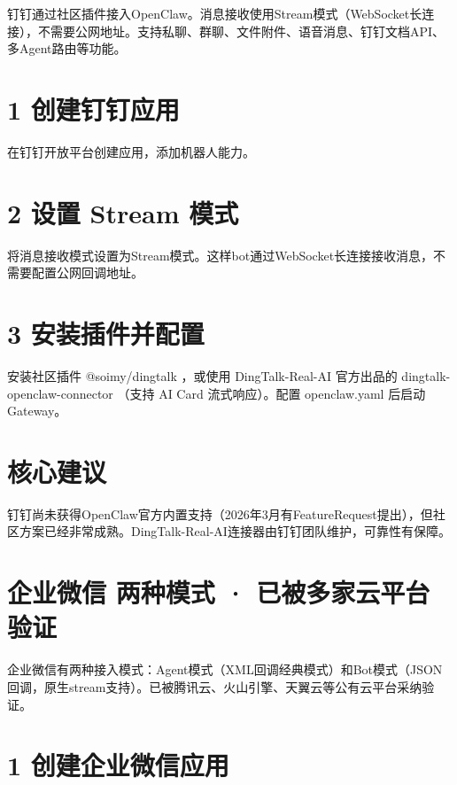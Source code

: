 \documentclass[
  10
]{article}
\begin{document}
钉钉通过社区插件接入OpenClaw。消息接收使用Stream模式（WebSocket长连接），不需要公网地址。支持私聊、群聊、文件附件、语音消息、钉钉文档API、多Agent路由等功能。

\section{1 创建钉钉应用}\label{ux521bux5efaux9489ux9489ux5e94ux7528}

在钉钉开放平台创建应用，添加机器人能力。

\section{2 设置 Stream 模式}\label{ux8bbeux7f6e-stream-ux6a21ux5f0f}

将消息接收模式设置为Stream模式。这样bot通过WebSocket长连接接收消息，不需要配置公网回调地址。

\section{3
安装插件并配置}\label{ux5b89ux88c5ux63d2ux4ef6ux5e76ux914dux7f6e}

安装社区插件 @soimy/dingtalk ，或使用 DingTalk-Real-AI 官方出品的
dingtalk-openclaw-connector （支持 AI Card 流式响应）。配置
openclaw.yaml 后启动 Gateway。

\section{核心建议}\label{ux6838ux5fc3ux5efaux8bae-9}

钉钉尚未获得OpenClaw官方内置支持（2026年3月有FeatureRequest提出），但社区方案已经非常成熟。DingTalk-Real-AI连接器由钉钉团队维护，可靠性有保障。

\section{企业微信 两种模式 ·
已被多家云平台验证}\label{ux4f01ux4e1aux5faeux4fe1-ux4e24ux79cdux6a21ux5f0f-ux5df2ux88abux591aux5bb6ux4e91ux5e73ux53f0ux9a8cux8bc1}

企业微信有两种接入模式：Agent模式（XML回调经典模式）和Bot模式（JSON回调，原生stream支持）。已被腾讯云、火山引擎、天翼云等公有云平台采纳验证。

\section{1
创建企业微信应用}\label{ux521bux5efaux4f01ux4e1aux5faeux4fe1ux5e94ux7528}
\end{document}
